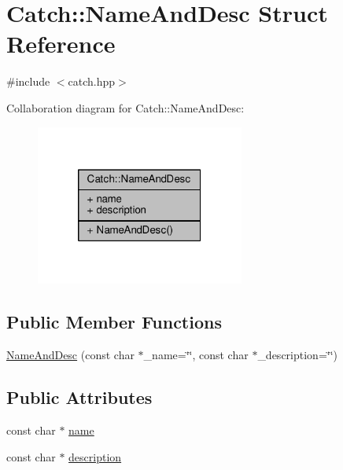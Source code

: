 \hypertarget{struct_catch_1_1_name_and_desc}{\section{Catch\-:\-:Name\-And\-Desc Struct Reference}
\label{struct_catch_1_1_name_and_desc}
}


{\ttfamily \#include $<$catch.\-hpp$>$}



Collaboration diagram for Catch\-:\-:Name\-And\-Desc\-:
\nopagebreak
\begin{figure}[H]
\begin{center}
\leavevmode
\includegraphics[width=194pt]{struct_catch_1_1_name_and_desc__coll__graph}
\end{center}
\end{figure}
\subsection*{Public Member Functions}
\begin{DoxyCompactItemize}
\item 
\hyperlink{struct_catch_1_1_name_and_desc_a189ceb9942fb5f6635140d6a09fc843a}{Name\-And\-Desc} (const char $\ast$\-\_\-name=\char`\"{}\char`\"{}, const char $\ast$\-\_\-description=\char`\"{}\char`\"{})
\end{DoxyCompactItemize}
\subsection*{Public Attributes}
\begin{DoxyCompactItemize}
\item 
const char $\ast$ \hyperlink{struct_catch_1_1_name_and_desc_a374b4ed8be3cf98be20ebde5273bde51}{name}
\item 
const char $\ast$ \hyperlink{struct_catch_1_1_name_and_desc_a3463a23ff65ce494fc380452b57b7970}{description}
\end{DoxyCompactItemize}



